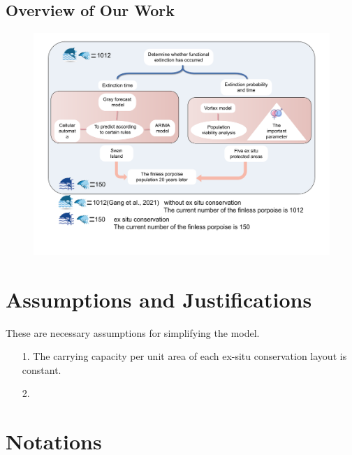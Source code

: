 \documentclass{mcmthesis}
\numberwithin{figure}{section}
\numberwithin{table}{section}
\numberwithin{equation}{section}
\begin{document}
\subsection{Overview of Our Work}
\newpage
\begin{figure}[htbp]
  \centering
  \includegraphics[width = 15cm]{codes/框架图.pdf}
\end{figure}




\section{Assumptions and Justifications}
These are necessary assumptions for simplifying the model.
\begin{enumerate}
  \item [1.] The carrying capacity per unit area of each ex-situ conservation layout is constant.
  \item [2.] 
\end{enumerate}


\section{Notations}

\renewcommand\arraystretch{1.5}
\end{document}
